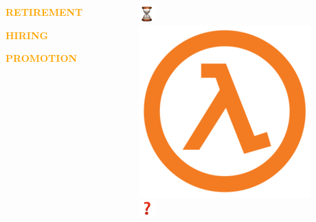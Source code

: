 \documentclass{beamer}
\begin{document}
\begin{frame}
    \centering
    \begin{columns}
        \begin{column}{.45\textwidth}
        \centering
        \LARGE{\textcolor{orange}{\textbf{RETIREMENT}}} \\
        \vspace{.75cm}

        \LARGE{\textcolor{orange}{\textbf{HIRING}}} \\
        \vspace{.75cm}

        \LARGE{\textcolor{orange}{\textbf{PROMOTION}}} \\
        \end{column}
        \hspace{-1cm}
        \begin{column}{.25\textwidth}
        \includegraphics[width=.5\textwidth]{static/retirement.pdf} \\
        \includegraphics[width=.5\textwidth]{static/hire.pdf} \\
        \includegraphics[width=.5\textwidth]{static/promotion.pdf} \\

\end{column}
\end{columns}
\end{frame}
\end{document}
